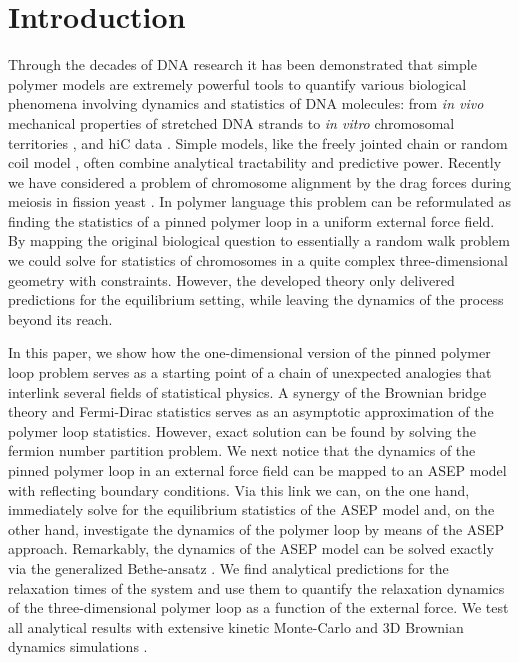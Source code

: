 \documentclass[aps,showpacs,twocolumn,floatfix,prx,superscriptaddress]{revtex4-1}
\begin{document}
\section{Introduction}
Through the decades of DNA research it has been demonstrated that simple polymer models are extremely powerful tools to quantify various biological phenomena involving dynamics and statistics of DNA molecules: from {\em in vivo} mechanical properties of stretched DNA strands \cite{Wirtz1995,Quake1997a,Lin2015} to {\em in vitro} chromosomal territories \cite{Jun2010a,Halverson2014,Giorgetti2014,Sachs1995,Ha2015}, and hiC data \cite{Mizuguchi2015a}. Simple models, like the freely jointed chain or random coil model \cite{DeGennes1979,Doi1988}, often combine analytical tractability and predictive power. Recently we have considered a problem of chromosome alignment by the drag forces during meiosis in fission yeast \cite{Lin2015}. In polymer language this problem can be reformulated as finding the statistics of a pinned polymer loop in a uniform external force field. By mapping the original biological question to essentially a random walk problem we could solve for statistics of chromosomes in a quite complex three-dimensional geometry with constraints\cite{Lin2015}. However, the developed theory only delivered predictions for the equilibrium setting, while leaving the dynamics of the process beyond its reach. %

In this paper, we show how the one-dimensional version of the pinned polymer loop problem serves as a starting point of a chain of unexpected analogies that interlink several fields of statistical physics\cite{Chandler1987,Huang1987}. A synergy of the Brownian bridge theory and Fermi-Dirac statistics serves as an asymptotic approximation of the polymer loop statistics. However, exact solution can be found by solving the fermion number partition problem. We next notice that the dynamics of the pinned polymer loop in an external force field can be mapped to an ASEP model \cite{Derrida1998,Bressloff2013,Schutz2001} with reflecting boundary conditions. Via this link we can, on the one hand, immediately solve for the equilibrium statistics of the ASEP model and, on the other hand, investigate the dynamics of the polymer loop by means of the ASEP approach. Remarkably, the dynamics of the ASEP model can be solved exactly via the generalized Bethe-ansatz \cite{DeGier2005,Simon2009,Batchelor2007}. We find analytical predictions for the relaxation times of the system and use them to quantify the relaxation dynamics of the three-dimensional polymer loop as a function of the external force. We test all analytical results with extensive kinetic Monte-Carlo \cite{Gillespie1976} and 3D Brownian dynamics simulations \cite{Cruz2012,Somasi2002}. 
\end{document}
